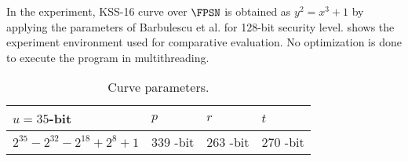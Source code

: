 In the experiment, KSS-16 curve over $\FPSN$ is obtained as $y^2 = x^3 + 1$ by applying the parameters  of Barbulescu et al. \cite{sylvain_new_param}  for 128-bit security level.
 shows the experiment environment used for comparative evaluation. 
No optimization is done to execute the program in multithreading.
\renewcommand{\baselinestretch}{1.5}
\begin{table}[t]
\centering
\caption{Curve parameters.}
\begin{tabular}{|l|l|l|l|}
\hline
$u= 35$-bit                 & $p$      & $r$      & $t$      \\ \hline
$2^{35}-2^{32}-2^{18}+2^8+1$ & 339 -bit & 263 -bit & 270 -bit \\ \hline
\end{tabular}
\end{table}
\begin{table}[t]
	\centering
	\fontsize{8pt}{8pt}\selectfont
	\caption{Experimental Implementation Environment.}
	\label{environment}
\end{table}
